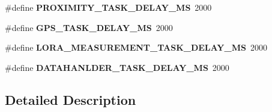 \begin{DoxyCompactItemize}
\item 
\hypertarget{group___task_gade4240fb789a23a18e789efa6e9405bb}{}\#define {\bfseries P\+R\+O\+X\+I\+M\+I\+T\+Y\+\_\+\+T\+A\+S\+K\+\_\+\+D\+E\+L\+A\+Y\+\_\+\+M\+S}~2000\label{group___task_gade4240fb789a23a18e789efa6e9405bb}

\item 
\hypertarget{group___task_ga66796c0fa15b56ff4e2484a2c4b1d567}{}\#define {\bfseries G\+P\+S\+\_\+\+T\+A\+S\+K\+\_\+\+D\+E\+L\+A\+Y\+\_\+\+M\+S}~2000\label{group___task_ga66796c0fa15b56ff4e2484a2c4b1d567}

\item 
\hypertarget{group___task_ga9f3ee0b26708692e5097bb3428870659}{}\#define {\bfseries L\+O\+R\+A\+\_\+\+M\+E\+A\+S\+U\+R\+E\+M\+E\+N\+T\+\_\+\+T\+A\+S\+K\+\_\+\+D\+E\+L\+A\+Y\+\_\+\+M\+S}~2000\label{group___task_ga9f3ee0b26708692e5097bb3428870659}

\item 
\hypertarget{group___task_gaa62c427682cbd6afd546750fc4f2ca6f}{}\#define {\bfseries D\+A\+T\+A\+H\+A\+N\+L\+D\+E\+R\+\_\+\+T\+A\+S\+K\+\_\+\+D\+E\+L\+A\+Y\+\_\+\+M\+S}~2000\label{group___task_gaa62c427682cbd6afd546750fc4f2ca6f}

\end{DoxyCompactItemize}


\subsection{Detailed Description}
